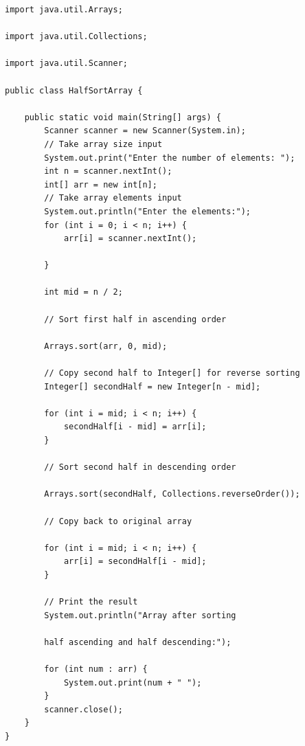\begin{verbatim}
import java.util.Arrays;

import java.util.Collections;

import java.util.Scanner;

public class HalfSortArray {

    public static void main(String[] args) {
        Scanner scanner = new Scanner(System.in);
        // Take array size input
        System.out.print("Enter the number of elements: ");
        int n = scanner.nextInt();
        int[] arr = new int[n];
        // Take array elements input
        System.out.println("Enter the elements:");
        for (int i = 0; i < n; i++) {
            arr[i] = scanner.nextInt();
            
        }
        
        int mid = n / 2;
        
        // Sort first half in ascending order
        
        Arrays.sort(arr, 0, mid);
        
        // Copy second half to Integer[] for reverse sorting
        Integer[] secondHalf = new Integer[n - mid];
        
        for (int i = mid; i < n; i++) {
            secondHalf[i - mid] = arr[i];
        }
        
        // Sort second half in descending order
        
        Arrays.sort(secondHalf, Collections.reverseOrder());

        // Copy back to original array
        
        for (int i = mid; i < n; i++) {
            arr[i] = secondHalf[i - mid];
        }
        
        // Print the result
        System.out.println("Array after sorting 
        
        half ascending and half descending:");
        
        for (int num : arr) {
            System.out.print(num + " ");
        }
        scanner.close();
    }
}
\end{verbatim}